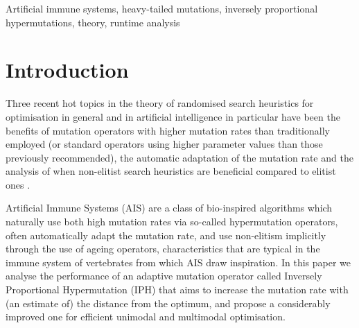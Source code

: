 \documentclass[lettersize,journal]{IEEEtran}
\begin{document}
\begin{IEEEkeywords}
Artificial immune systems, heavy-tailed mutations, inversely proportional hypermutations, theory, runtime analysis
\end{IEEEkeywords}

\section{Introduction}
Three recent hot topics in the theory of randomised search heuristics for optimisation in general and in artificial intelligence in particular have been the benefits of mutation operators with higher mutation rates than traditionally employed\cite{FQWGECCO18,FGQWPPSN18,CorusOlivetoYazdani2021TEVC,DoerrGECCO2017FastGA} (or standard operators using higher parameter values than those previously recommended\cite{CorusOlivetoTEVCsteadyGA2017,JumpTEVC2017,CorusOlivetoGecco2019,OlivetoSudholtWitt2020,DoerrDoerrEbel2015,LenglerTEVC2019}), the automatic adaptation of the mutation rate \cite{DoerrDoerrBookChapter,DLOW2018,DoerrEtAl2016B,LissovoiEtAl2020ECJ,LOWAAAI2020} and the analysis of when non-elitist search heuristics are beneficial compared to elitist ones \cite{OlivetoPaizJorgeSudholt2017Algorithmica,LOW2023,Lehr2021AAAI,DoerrComma2020,CaseLehreTEVC,DangJansenLehreGECCO2015,DangLehreFOGA2015,LenglerSchillerSieberling2024,HeviaSudholtAlgo24}. 

Artificial Immune Systems (AIS) are a class of bio-inspired algorithms which naturally use both high mutation rates via so-called hypermutation operators, often automatically adapt the mutation rate,  and use non-elitism implicitly through the use of ageing operators, characteristics that are typical in the immune system of vertebrates from which AIS draw inspiration. In this paper we analyse the performance of an adaptive mutation operator called Inversely Proportional Hypermutation (IPH) that aims to increase the mutation rate with (an estimate of) the distance from the optimum, and propose a considerably improved one for efficient unimodal and multimodal optimisation.
\end{document}
